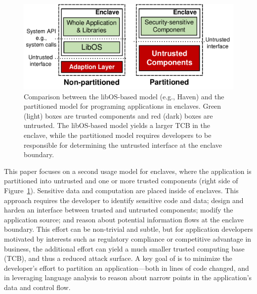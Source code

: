 \begin{figure}[t!]
\centering
\includegraphics[width=\linewidth]{figures/libosvssdk.pdf}
\footnotesize
\vspace{-0.2in}
\caption{
Comparison between the libOS-based model (e.g., Haven)
and the partitioned model for programing applications in enclaves.
Green (light) boxes are trusted components and red (dark) boxes are untrusted.
The libOS-based model yields a larger TCB in the enclave,
while the partitioned model requires developers to be responsible for determining the untrusted interface at the enclave boundary.
}
\label{fig:libosvssdk}
\end{figure}


This paper focuses on a second usage model for enclaves, where the application is partitioned into
untrusted and one or more trusted components (right side of Figure~\ref{fig:libosvssdk}).
Sensitive data and computation are placed inside of enclaves.  This approach requires the developer to
identify sensitive code and data; design and harden an interface between trusted and untrusted components; 
modify the application source; and reason about potential information flows at the enclave boundary.
This effort can be non-trivial and subtle, but for application developers motivated by interests such as 
regulatory compliance or competitive advantage in business, the additional effort can yield a much smaller trusted computing
base (TCB), and thus a reduced attack surface.
A key goal of \sysname{} is to minimize the developer's effort to partition an application---both in lines of 
code changed, and in leveraging language analysis to reason about narrow points in the application's data and control flow.



